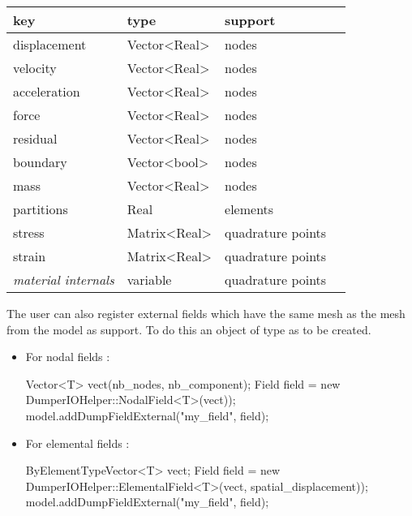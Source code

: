 \begin{tabular}{llll}
  \toprule
  key          &    type      & support \\
  \midrule
  displacement & Vector<Real> & nodes  \\
  velocity     & Vector<Real> & nodes  \\
  acceleration & Vector<Real> & nodes  \\
  force	     & Vector<Real> & nodes  \\
  residual     & Vector<Real> & nodes  \\
  boundary     & Vector<bool> & nodes  \\
  mass         & Vector<Real> & nodes  \\
  partitions   & Real         & elements \\
  stress & Matrix<Real> & quadrature points  \\
  strain & Matrix<Real> & quadrature points  \\
  \textit{material internals} & variable  & quadrature points  \\
\bottomrule
\end{tabular}


The user can also register external fields which have the same mesh as the mesh from the model as support. To do this an object of type  as to be created.

\begin{itemize}
\item For nodal fields :
\begin{cpp}
  Vector<T> vect(nb_nodes, nb_component);
  Field field = new DumperIOHelper::NodalField<T>(vect));
  model.addDumpFieldExternal("my_field", field);
\end{cpp}

\item For elemental fields :
\begin{cpp}
  ByElementTypeVector<T> vect;
  Field field = new DumperIOHelper::ElementalField<T>(vect, spatial_displacement));
  model.addDumpFieldExternal("my_field", field);
\end{cpp}
\end{itemize}